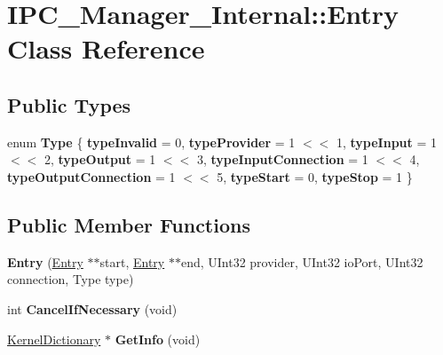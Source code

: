 \hypertarget{class_i_p_c___manager___internal_1_1_entry}{}\section{I\+P\+C\+\_\+\+Manager\+\_\+\+Internal\+:\+:Entry Class Reference}
\label{class_i_p_c___manager___internal_1_1_entry}
\subsection*{Public Types}
\begin{DoxyCompactItemize}
\item 
\mbox{\label{class_i_p_c___manager___internal_1_1_entry_a94f0b89803d1929ab5c2b5eb2f1afb9c}} 
enum {\bfseries Type} \{ \newline
{\bfseries type\+Invalid} = 0, 
{\bfseries type\+Provider} = 1 $<$$<$ 1, 
{\bfseries type\+Input} = 1 $<$$<$ 2, 
{\bfseries type\+Output} = 1 $<$$<$ 3, 
\newline
{\bfseries type\+Input\+Connection} = 1 $<$$<$ 4, 
{\bfseries type\+Output\+Connection} = 1 $<$$<$ 5, 
{\bfseries type\+Start} = 0, 
{\bfseries type\+Stop} = 1
 \}
\end{DoxyCompactItemize}
\subsection*{Public Member Functions}
\begin{DoxyCompactItemize}
\item 
\mbox{\label{class_i_p_c___manager___internal_1_1_entry_a2ff426f22a51d430862f6cabf85e2a45}} 
{\bfseries Entry} (\hyperlink{class_i_p_c___manager___internal_1_1_entry}{Entry} $\ast$$\ast$start, \hyperlink{class_i_p_c___manager___internal_1_1_entry}{Entry} $\ast$$\ast$end, U\+Int32 provider, U\+Int32 io\+Port, U\+Int32 connection, Type type)
\item 
\mbox{\label{class_i_p_c___manager___internal_1_1_entry_ae9f73fa712c307cf434237bc2d05969a}} 
int {\bfseries Cancel\+If\+Necessary} (void)
\item 
\mbox{\label{class_i_p_c___manager___internal_1_1_entry_a7615fe5e9643d8548448c477e30a3f3f}} 
\hyperlink{class_kernel_dictionary}{Kernel\+Dictionary} $\ast$ {\bfseries Get\+Info} (void)
\end{DoxyCompactItemize}
